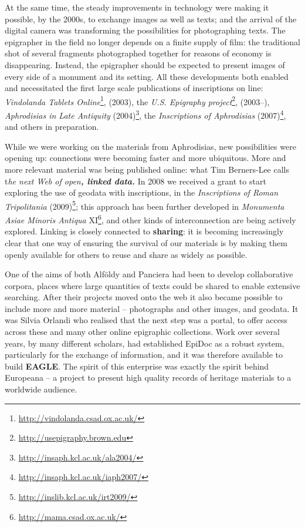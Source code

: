 \documentclass[amsthm,ebook]{saparticle}
\begin{document}
At the same time, the steady improvements in technology were making  it possible, 
by the 2000s, to exchange images as well as texts; and the arrival of the digital 
camera was transforming the possibilities for photographing texts. The epigrapher 
in the field no longer depends on a finite supply of film: the traditional shot 
of several fragments photographed together for reasons of economy is disappearing. 
Instead, the epigrapher should be expected to present images of every side of a 
monument and its setting. All these developments both enabled and necessitated 
the first large scale publications of inscriptions on line: \textit{Vindolanda 
Tablets Online}\footnote{\url{http://vindolanda.csad.ox.ac.uk/}}, (2003), the \textit{U.S. Epigraphy project}\footnote{\url{http://usepigraphy.brown.edu}}, (2003–), \textit{Aphrodisias 
in Late Antiquity} (2004)\footnote{\url{http://insaph.kcl.ac.uk/ala2004/}},\textsuperscript{ }  the \textit{Inscriptions of Aphrodisias} 
(2007)\footnote{\url{http://insaph.kcl.ac.uk/iaph2007/}}, and others in preparation.

While we were working on the materials from Aphrodisias, new possibilities were 
opening up: connections were becoming faster and more ubiquitous. More and more 
relevant material was being published online: what Tim Berners-Lee calls t\label{HGoBack}\textit{he 
next Web of open}\textit{\textbf{, linked data. }}In 2008 we received a grant to 
start exploring the use of geodata with inscriptions, in the \textit{Inscriptions 
of Roman Tripolitania} (2009)\footnote{\url{http://inslib.kcl.ac.uk/irt2009/}}; this approach has been further developed in \textit{Monumenta 
Asiae Minoris Antiqua} XI\footnote{\url{http://mama.csad.ox.ac.uk/}},  and other kinds of interconnection are being actively 
explored. Linking is closely connected to \textbf{sharing}: it is becoming increasingly 
clear that one way of ensuring the survival of our materials is by making them 
openly available for others to reuse and share as widely as possible.

One of the aims of both Alföldy and Panciera had been to develop collaborative 
corpora, places where large quantities of texts could be shared to enable extensive 
searching. After their projects moved onto the web it also became possible to include 
more and more material – photographs and other images, and geodata. It was Silvia 
Orlandi who realised that the next step was a portal, to offer access across these 
and many other online epigraphic collections. Work over several years, by many 
different scholars, had established EpiDoc as a robust system, particularly for 
the exchange of information, and it was therefore available to build \textbf{EAGLE}. 
The spirit of this enterprise was exactly the spirit behind Europeana –  a project 
to present high quality records of heritage materials to a worldwide audience. 
\end{document}
